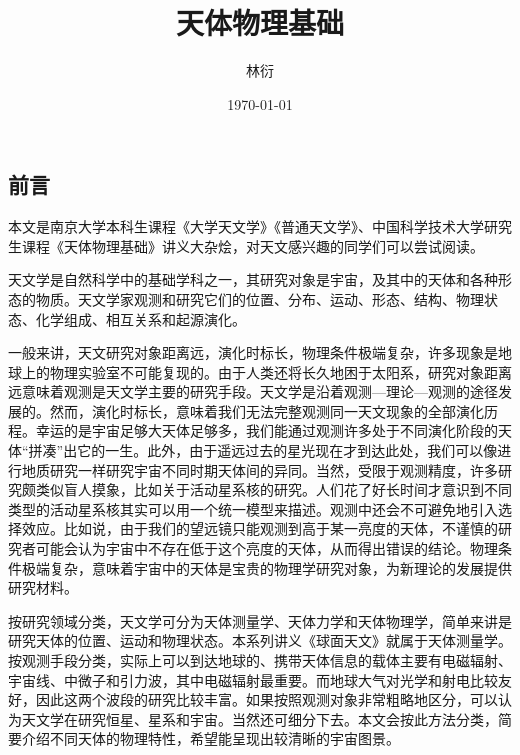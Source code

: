 \documentclass[UTF8, 12pt, a4paper, oneside, onecolumn, fontset=none]{ctexart}
\title{天体物理基础}
\author{林衍}
\date{\today}
\begin{document}
\maketitle
\subsection*{前言}
本文是南京大学本科生课程《大学天文学》《普通天文学》、中国科学技术大学研究生课程《天体物理基础》讲义大杂烩，对天文感兴趣的同学们可以尝试阅读。

天文学是自然科学中的基础学科之一，其研究对象是宇宙，及其中的天体和各种形态的物质。天文学家观测和研究它们的位置、分布、运动、形态、结构、物理状态、化学组成、相互关系和起源演化。

一般来讲，天文研究对象距离远，演化时标长，物理条件极端复杂，许多现象是地球上的物理实验室不可能复现的。由于人类还将长久地困于太阳系，研究对象距离远意味着观测是天文学主要的研究手段。天文学是沿着观测—理论—观测的途径发展的。然而，演化时标长，意味着我们无法完整观测同一天文现象的全部演化历程。幸运的是宇宙足够大天体足够多，我们能通过观测许多处于不同演化阶段的天体“拼凑”出它的一生。此外，由于遥远过去的星光现在才到达此处，我们可以像进行地质研究一样研究宇宙不同时期天体间的异同。当然，受限于观测精度，许多研究颇类似盲人摸象，比如关于活动星系核的研究。人们花了好长时间才意识到不同类型的活动星系核其实可以用一个统一模型来描述。观测中还会不可避免地引入选择效应。比如说，由于我们的望远镜只能观测到高于某一亮度的天体，不谨慎的研究者可能会认为宇宙中不存在低于这个亮度的天体，从而得出错误的结论。物理条件极端复杂，意味着宇宙中的天体是宝贵的物理学研究对象，为新理论的发展提供研究材料。

按研究领域分类，天文学可分为天体测量学、天体力学和天体物理学，简单来讲是研究天体的位置、运动和物理状态。本系列讲义《球面天文》就属于天体测量学。按观测手段分类，实际上可以到达地球的、携带天体信息的载体主要有电磁辐射、宇宙线、中微子和引力波，其中电磁辐射最重要。而地球大气对光学和射电比较友好，因此这两个波段的研究比较丰富。如果按照观测对象非常粗略地区分，可以认为天文学在研究恒星、星系和宇宙。当然还可细分下去。本文会按此方法分类，简要介绍不同天体的物理特性，希望能呈现出较清晰的宇宙图景。

\newpage
\tableofcontents

\newpage







\end{document}
